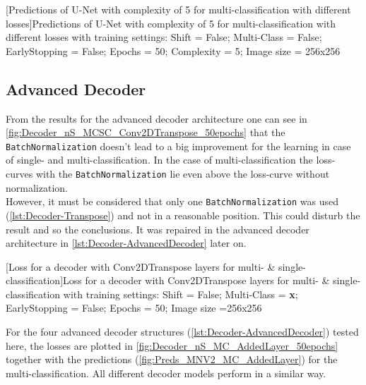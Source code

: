 \begin{minipage}{\textwidth}
    \hspace{0.2cm}
	[Predictions of U-Net with complexity of 5 for multi-classification with different losses]{Predictions of U-Net with complexity of 5 for multi-classification with different losses with training settings: Shift = False; Multi-Class = False; EarlyStopping = False; Epochs = 50; Complexity = 5; Image size = 256x256}
	\label{fig:Preds_unet_jaccard}
	\vspace{5mm}
\end{minipage}



\subsection{Advanced Decoder}
From the results for the advanced decoder architecture one can see in \cref{fig:Decoder_nS_MCSC_Conv2DTranspose_50epochs} that the \verb|BatchNormalization| doesn't lead to a big improvement for the learning in case of single- and multi-classification. In the case of multi-classification the loss-curves with the \verb|BatchNormalization| lie even above the loss-curve without normalization.\\
However, it must be considered that only one \verb|BatchNormalization| was used (\cref{lst:Decoder-Transpose}) and not in a reasonable position. This could disturb the result and so the conclusions. It was repaired in the advanced decoder architecture in \cref{lst:Decoder-AdvancedDecoder} later on.\\
\begin{minipage}{\textwidth}
	
	[Loss for a decoder with Conv2DTranspose layers for multi- \& single-classification]{Loss for a decoder with Conv2DTranspose layers for multi- \& single-classification with training settings: Shift = False; Multi-Class = \textbf{x}; EarlyStopping = False; Epochs = 50; Image size =256x256}
	\label{fig:Decoder_nS_MCSC_Conv2DTranspose_50epochs}
	\vspace{5mm}
\end{minipage}
For the four advanced decoder structures (\cref{lst:Decoder-AdvancedDecoder}) tested here, the losses are plotted in \cref{fig:Decoder_nS_MC_AddedLayer_50epochs} together with the predictions (\cref{fig:Preds_MNV2_MC_AddedLayer}) for the multi-classification. All different decoder models perform in a similar way.\\
